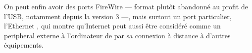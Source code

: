 On peut enfin avoir des ports FireWire%
 --- format plutôt abandonné au profit de l'USB, notamment depuis la version 3 ---, mais surtout un port particulier, l'Ethernet%
, qui montre qu'Internet peut aussi être considéré comme un \gls{peripheral} externe à l'ordinateur de par sa connexion à distance à d'autres équipements. 

